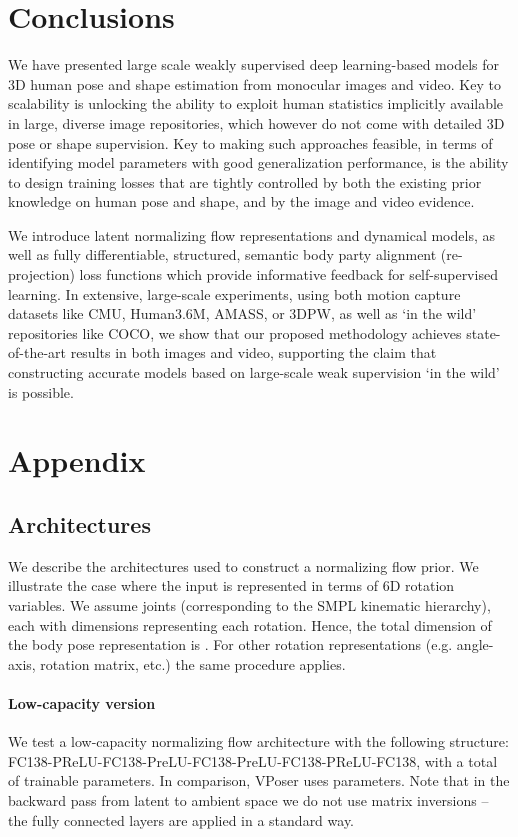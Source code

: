 \documentclass[runningheads]{llncs}
\begin{document}
\section{Conclusions}

We have presented large scale weakly supervised deep learning-based models for 3D human pose and shape estimation from monocular images and video. Key to scalability is unlocking the ability to exploit human statistics implicitly available in large, diverse image repositories, which however do not come with detailed 3D pose or shape supervision. Key to making such approaches feasible, in terms of identifying model parameters with good generalization performance, is the ability to design training losses that are tightly controlled by both the existing prior knowledge on human pose and shape, and by the image and video evidence. 

We introduce latent normalizing flow representations and dynamical models, as well as fully differentiable, structured, semantic body party alignment (re-projection) loss functions which provide informative feedback for self-supervised learning. In extensive, large-scale experiments, using both motion capture datasets like CMU, Human3.6M, AMASS, or 3DPW, as well as `in the wild' repositories like COCO, we show that our proposed methodology achieves state-of-the-art results in both images and video, supporting the claim that constructing accurate models based on large-scale weak supervision `in the wild' is possible.

\clearpage
\section{Appendix}
\subsection{Architectures}
We describe the architectures used to construct a normalizing flow prior. We illustrate the case where the input is represented in terms of 6D rotation variables. We assume  joints (corresponding to the SMPL kinematic hierarchy), each with  dimensions representing each rotation. Hence, the total dimension of the body pose representation is . For other rotation representations (e.g. angle-axis, rotation matrix, etc.) the same procedure applies.

\paragraph{Low-capacity version} We test a low-capacity normalizing flow architecture with the following structure: FC138-PReLU-FC138-PreLU-FC138-PreLU-FC138-PReLU-FC138, with a total of  trainable parameters. In comparison, VPoser\cite{pavlakoscvpr2019} uses  parameters. Note that in the backward pass from latent to ambient space we do not use matrix inversions -- the fully connected layers are applied in a standard way.
\end{document}
